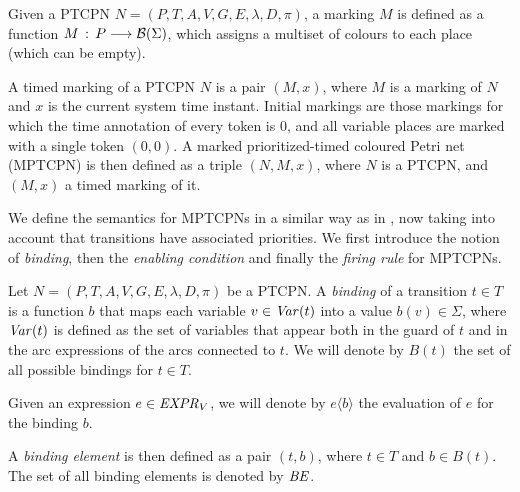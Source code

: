 \begin{definition} [(Markings)]
Given a PTCPN $N=(P,T,A,V,G,E,\lambda,D,\pi)$,
a marking $M$ is defined as a function
$M\,:\,P \longrightarrow {\cal B}(\Sigma)$,
which assigns a multiset of colours to each place
(which can be empty). 

A timed marking of a PTCPN $N$ is a pair $(M,x)$, where
$M$ is a marking of $N$ and $x$ is the current system time instant.
%
%
Initial markings are those markings for which
the time annotation of every token is $0$,
and all variable places are marked with a single
token $(0,0)$.
A marked prioritized-timed coloured Petri net (MPTCPN)
is then defined as a triple $(N,M,x)$, where
$N$ is a PTCPN, and $(M,x)$ a timed marking of it.
%
\end{definition}

We define the semantics for MPTCPNs in a similar way as in \cite{CPN09}, 
now taking into account that transitions have associated priorities.
We first introduce the notion of {\em binding}, then
the {\em enabling condition} and finally the {\em firing rule}
for MPTCPNs.

\begin{definition} [(Bindings)]
Let $N=(P,T,A,V,G,E,\lambda,D,\pi)$ be a PTCPN.
A {\em binding} of a transition $t \in T$ is a function
$b$ that maps each variable $v \in {\it Var}(t)$
into a value $b(v) \in \Sigma$, where ${\it Var}(t)$
is defined as the set of variables that appear both
in the guard of $t$ and
in the arc expressions of the arcs connected to $t$.
We will denote by $B(t)$ the set of all possible bindings
for $t \in T$. 

Given an expression $e \in {\it EXPR}_V$, we will denote 
by $e\langle b \rangle$ the evaluation of $e$ for the
binding $b$.

A {\em binding element} is then defined as a pair
$(t,b)$, where $t \in T$ and $b \in B(t)$.
The set of all binding elements is denoted by ${\it BE}$.
\end{definition}

